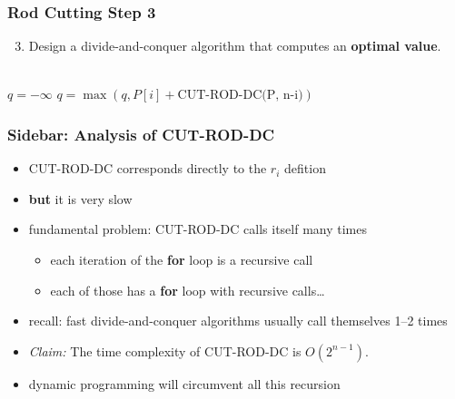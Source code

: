 \documentclass[10pt,aspectratio=169]{beamer}
\newcommand{\stanza}{ \\~\ }
\begin{document}
\begin{frame} \frametitle{Rod Cutting Step 3}
  \begin{enumerate}
    \setcounter{enumi}{2}
    \item Design a divide-and-conquer algorithm that computes an \textbf{optimal value}.
    \stanza
  \end{enumerate}

  \begin{algorithmic}[1]
      \State {}
    \EndIf
    \State $q = -\infty$
      \State $q = \max(q, P[i] + \text{CUT-ROD-DC(P, n-i)})$
    \EndFor
    \State {}
    \EndFunction
  \end{algorithmic}
\end{frame}

\begin{frame} \frametitle{Sidebar: Analysis of CUT-ROD-DC}
\begin{itemize}
  \item CUT-ROD-DC corresponds directly to the $r_i$ defition
  \item \textbf{but} it is very slow
  \item fundamental problem: CUT-ROD-DC calls itself many times
  \begin{itemize}
    \item each iteration of the \textbf{for} loop is a recursive call
    \item each of those has a \textbf{for} loop with recursive calls\ldots
  \end{itemize}
  \item recall: fast divide-and-conquer algorithms usually call themselves 1--2 times
  \item \emph{Claim:} The time complexity of CUT-ROD-DC is $O(2^{n-1}).$
  \item dynamic programming will circumvent all this recursion
\end{itemize}
\end{frame}
\end{document}
